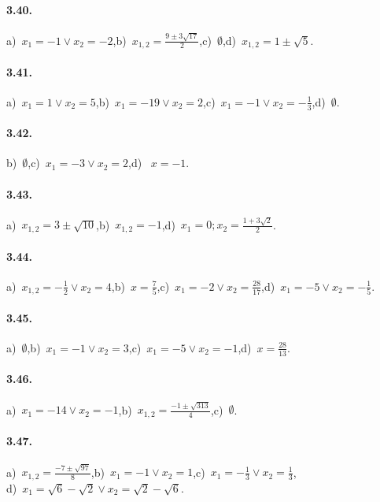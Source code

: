 \paragraph{3.40.} a)~$x_{1} =-1 \vee x_{2} =-2$,\quad b)~$x_{1,2} = \frac{9 \pm 3 \sqrt{17}}{2}$,\quad c)~$\emptyset$,\quad d)~$x_{1,2} = 1 \pm \sqrt{5}$.

\paragraph{3.41.} a)~$x_{1} = 1 \vee x_{2} = 5$,\quad b)~$x_{1} =-19 \vee x_{2} = 2$,\quad c)~$x_{1} =-1 \vee x_{2} =-\frac{1}{3}$,\quad d)~$\emptyset$.

\paragraph{3.42.} b)~$\emptyset$,\quad c)~$x_{1} =-3 \vee x_{2} = 2$,\quad d)~ $x =-1$.

\paragraph{3.43.} a)~$x_{1,2} = 3 \pm \sqrt{10}$,\quad b)~$x_{1,2}=-1$,\quad d)~$x_{1} = 0;x_{2} = \frac{1 + 3 \sqrt{2}}{2}$.

\paragraph{3.44.} a)~$x_{1,2} =-\frac{1}{2} \vee x_{2} = 4$,\quad b)~$x=\frac{7}{5}$,\quad c)~$x_{1} =-2 \vee x_{2} = \frac{28}{17}$,\quad d)~$x_{1} =-5 \vee x_{2} =-\frac{1}{5}$.

\paragraph{3.45.} a)~$\emptyset$,\quad b)~$x_{1} =-1 \vee x_{2} = 3$,\quad c)~$x_{1} =-5 \vee x_{2} =-1$,\quad d)~$x = \frac{28}{13}$.

\paragraph{3.46.} a)~$x_{1} =-14 \vee x_{2} =-1$,\quad b)~$x_{1,2} = \frac{- 1 \pm \sqrt{313}}{4}$,\quad c)~$\emptyset$.

\paragraph{3.47.} a)~$x_{1,2} = \frac{- 7 \pm \sqrt{97}}{8}$,\quad b)~$x_{1} =-1 \vee x_{2} = 1$,\quad c)~$x_{1} =-\frac{1}{3} \vee x_{2} = \frac{1}{3}$,\protect \\ \quad d)~$x_{1} = \sqrt{6}-\sqrt{2} \vee x_{2} = \sqrt{2}-\sqrt{6}$.

